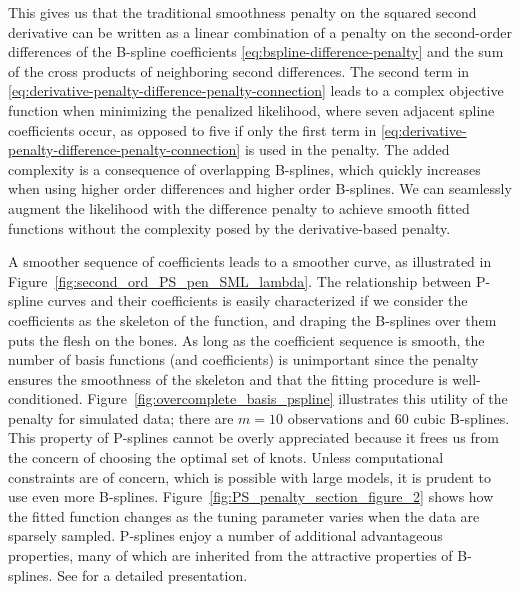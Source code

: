 \documentclass[12pt]{article}
\theoremstyle{definition}
\begin{document}
This gives us that the traditional smoothness penalty on the squared second derivative can be written as a linear combination of a penalty on the second-order differences of the B-spline coefficients \ref{eq:bspline-difference-penalty} and the sum of the cross products of neighboring second differences. The second term in \ref{eq:derivative-penalty-difference-penalty-connection} leads to a complex objective function when minimizing the penalized likelihood, where seven adjacent spline coefficients occur, as opposed to five if only the first term in \ref{eq:derivative-penalty-difference-penalty-connection} is used in the penalty. The added complexity is a consequence of overlapping B-splines, which quickly increases when using higher order differences and higher order B-splines. We can seamlessly augment the likelihood with the difference penalty to achieve smooth fitted functions without the complexity posed by the derivative-based penalty.

A smoother sequence of coefficients leads to a smoother curve, as illustrated in Figure~\ref{fig:second_ord_PS_pen_SML_lambda}.  The relationship between P-spline curves and their coefficients is easily characterized if we consider the coefficients as the skeleton of the function, and draping the B-splines over them puts the flesh on the bones. As long as the coefficient sequence is smooth, the number of basis functions (and coefficients) is unimportant since the penalty ensures the smoothness of the skeleton and that the fitting procedure is well-conditioned. Figure~\ref{fig:overcomplete_basis_pspline} illustrates this utility of the penalty for simulated data; there are $m=10$ observations and $60$ cubic B-splines. This property of P-splines cannot be overly appreciated because it frees us from the concern of choosing the optimal set of knots. Unless computational constraints are of concern, which is possible with large models, it is prudent to use even more B-splines. Figure~\ref{fig:PS_penalty_section_figure_2} shows how the fitted function changes as the tuning parameter varies when the data are sparsely sampled. P-splines enjoy a number of additional advantageous properties, many of which are inherited from the attractive properties of B-splines. See \citet{eilers1996flexible}  for a detailed presentation. 
\end{document}
